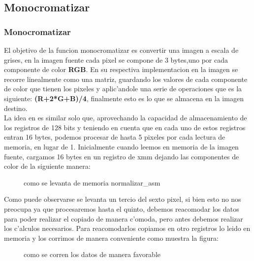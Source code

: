 \subsection{Monocromatizar}
\subsubsection{Monocromatizar  }
El objetivo de la funcion monocromatizar es convertir una imagen a escala de grises, en la imagen fuente
cada pixel se compone de 3 bytes,uno por cada componente de color \textbf{RGB}. En su respectiva implementacion en 
\C la imagen se recorre linealmente como una matriz, guardando los valores de cada componente de color
que tienen los pixeles y aplic'andole una serie de operaciones que es la siguiente:
\textbf{(R+2*G+B)/4}, finalmente esto es lo que se almacena en la imagen destino.\\
La idea en \ass es similar solo que, aprovechando la capacidad de almacenamiento de los registros de 128 bits
y teniendo en cuenta que en cada uno de estos registros entran 16 bytes, podemos procesar de hasta 5 pixeles
por cada lectura de memoria, en lugar de 1.
Inicialmente cuando leemos en memoria de la imagen fuente, cargamos 16 bytes en un registro de xmm dejando 
las componentes de color de la siguiente manera: \\
\begin{figure}[hb]
\caption{como se levanta de memoria normalizar\_asm}
\label{est:m-uno}
\end{figure}
Como puede observarse se levanta un tercio del sexto pixel, si bien esto no nos preocupa ya que procesaremos
hasta el quinto, debemos reacomodar los datos para poder realizar el copiado de manera c'omoda, pero
antes debemos realizar los c'alculos necesarios. Para reacomodarlos  copiamos en otro registros
lo leido en memoria y los corrimos de manera conveniente como muestra la figura: 
\begin{figure}[hb]
\caption{como se corren los datos de manera favorable}
\label{est:m-uno}
\end{figure}


